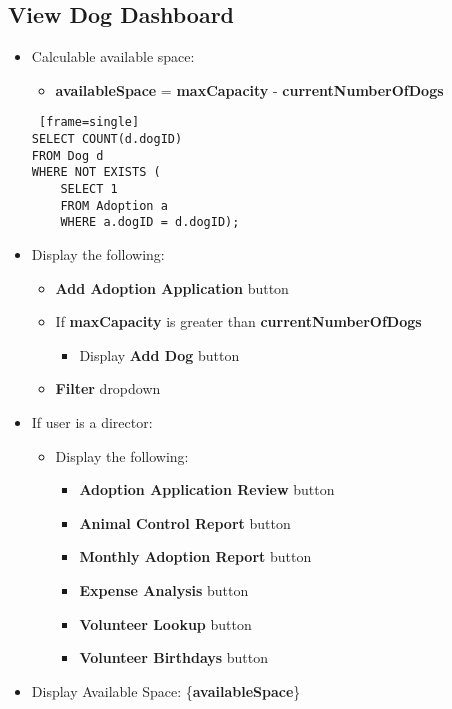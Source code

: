 \documentclass{article}
\begin{document}
\subsection{View Dog Dashboard}
\begin{itemize}
    \item Calculable available space:
    \begin{itemize}
        \item \textbf{availableSpace} = \textbf{maxCapacity} - \textbf{currentNumberOfDogs}
    \end{itemize}
    \begin{Verbatim} [frame=single]
SELECT COUNT(d.dogID) 
FROM Dog d
WHERE NOT EXISTS (
    SELECT 1
    FROM Adoption a 
    WHERE a.dogID = d.dogID);
    \end{Verbatim}
    \item Display the following:
    \begin{itemize}
        \item \textbf{Add Adoption Application} button
        \item If \textbf{maxCapacity} is greater than \textbf{currentNumberOfDogs}
        \begin{itemize}
            \item Display \textbf{Add Dog} button 
        \end{itemize}
        \item \textbf{Filter} dropdown
    \end{itemize}
    \item If user is a director:
    \begin{itemize}
        \item Display the following:
        \begin{itemize}
            \item \textbf{Adoption Application Review} button
            \item \textbf{Animal Control Report} button
            \item \textbf{Monthly Adoption Report} button
            \item \textbf{Expense Analysis} button
            \item \textbf{Volunteer Lookup} button
            \item \textbf{Volunteer Birthdays} button
        \end{itemize}
    \end{itemize}
    \item Display Available Space: \{\textbf{availableSpace}\}

\end{itemize}
\end{document}
